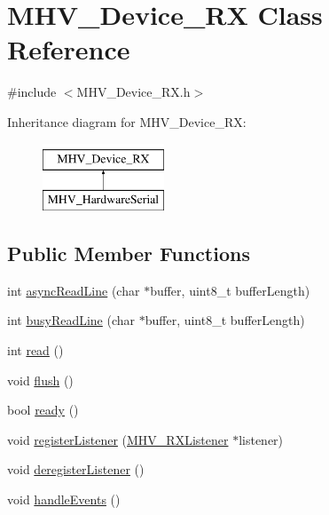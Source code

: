 \hypertarget{class_m_h_v___device___r_x}{
\section{\-M\-H\-V\-\_\-\-Device\-\_\-\-R\-X \-Class \-Reference}
\label{class_m_h_v___device___r_x}
}


{\ttfamily \#include $<$\-M\-H\-V\-\_\-\-Device\-\_\-\-R\-X.\-h$>$}

\-Inheritance diagram for \-M\-H\-V\-\_\-\-Device\-\_\-\-R\-X\-:\begin{figure}[H]
\begin{center}
\leavevmode
\includegraphics[height=2.000000cm]{class_m_h_v___device___r_x}
\end{center}
\end{figure}
\subsection*{\-Public \-Member \-Functions}
\begin{DoxyCompactItemize}
\item 
int \hyperlink{class_m_h_v___device___r_x_ad8da50a37b9f5e84428ce7920f6c7153}{async\-Read\-Line} (char $\ast$buffer, uint8\-\_\-t buffer\-Length)
\item 
int \hyperlink{class_m_h_v___device___r_x_a872dd2a1c97d5e1bb962df0d93c7c3cc}{busy\-Read\-Line} (char $\ast$buffer, uint8\-\_\-t buffer\-Length)
\item 
int \hyperlink{class_m_h_v___device___r_x_ab823ad1f27ec0a659ba3ab896e936b2c}{read} ()
\item 
void \hyperlink{class_m_h_v___device___r_x_a046e51e8d7b47e084fea8f2508e93ae9}{flush} ()
\item 
bool \hyperlink{class_m_h_v___device___r_x_a6d9d253544c30aff62bdcae14f9b2705}{ready} ()
\item 
void \hyperlink{class_m_h_v___device___r_x_a0a663d6511e7c27abdefc6e7d413e66a}{register\-Listener} (\hyperlink{class_m_h_v___r_x_listener}{\-M\-H\-V\-\_\-\-R\-X\-Listener} $\ast$listener)
\item 
void \hyperlink{class_m_h_v___device___r_x_aeaeee691f88b5895a09afbb1c47d83d1}{deregister\-Listener} ()
\item 
void \hyperlink{class_m_h_v___device___r_x_a13adea72a323b7debc5985e5bba21e58}{handle\-Events} ()
\end{DoxyCompactItemize}
